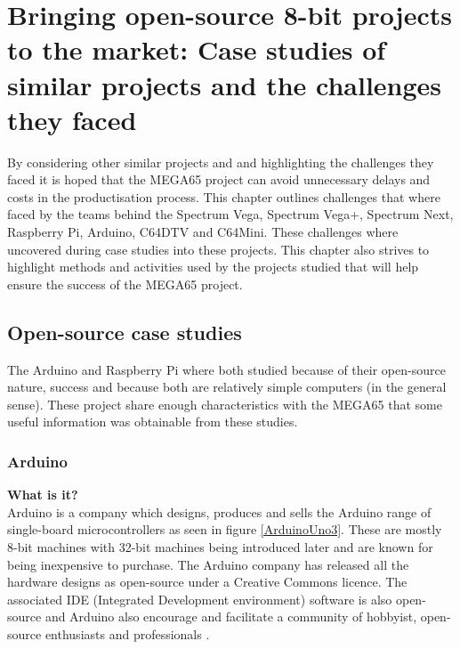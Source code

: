 
\chapter{Bringing open-source 8-bit projects to the market: Case studies of similar projects and the challenges they faced}
\label{Chapter3}
By considering other similar projects and and highlighting the challenges they faced it is hoped that the MEGA65 project can avoid unnecessary delays and costs in the productisation process. This chapter outlines challenges that where faced by the teams behind the Spectrum Vega, Spectrum Vega+, Spectrum Next, Raspberry Pi, Arduino, C64DTV and C64Mini. These challenges where uncovered during case studies into these projects. This chapter also strives to highlight methods and activities used by the projects studied that will help ensure the success of the MEGA65 project. 

\section{Open-source case studies}
The Arduino and Raspberry Pi where both studied because of their open-source nature, success and because both are relatively simple computers (in the general sense). These project share enough characteristics with the MEGA65 that some useful information was obtainable from these studies.

\subsection{Arduino}

\textbf{What is it?}\\
Arduino is a company which designs, produces and sells the Arduino range of single-board microcontrollers as seen in figure \ref{ArduinoUno3}. These are mostly 8-bit machines with 32-bit machines being introduced later and are known for being inexpensive to purchase. The Arduino company has released all the hardware designs as open-source under a Creative Commons licence. The associated IDE (Integrated Development environment) software is also open-source and Arduino also encourage and facilitate a community of hobbyist, open-source enthusiasts and professionals 
\cite{RN133}. \\

